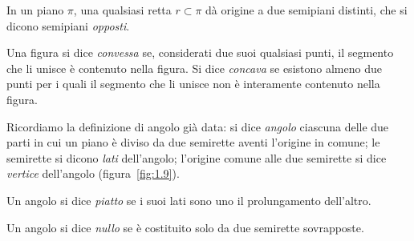 \begin{inaccessibleblock}
 \begin{center}\end{center}
\end{inaccessibleblock}
In un piano \({\pi}\), una qualsiasi retta \(r \subset \pi\) dà origine a 
due semipiani distinti, che si dicono semipiani \emph{opposti}.


\begin{definizione}
Una figura si dice \emph{convessa} se, considerati due suoi qualsiasi 
punti, il segmento che li unisce è contenuto nella figura. Si dice 
\emph{concava} se esistono almeno due punti per i quali il segmento 
che li unisce non è interamente contenuto nella figura. 
\end{definizione}

\begin{inaccessibleblock}
 \begin{center} \end{center}
\end{inaccessibleblock}

Ricordiamo la definizione di angolo già data: si dice \emph{angolo} 
ciascuna delle due parti in cui un piano è diviso da due semirette 
aventi l'origine in comune; le semirette si dicono \emph{lati} 
dell'angolo; l'origine comune alle due semirette si dice 
\emph{vertice} dell'angolo (figura~\ref{fig:1.9}).

\begin{definizione}
Un angolo si dice \emph{piatto} se i suoi lati sono uno il 
prolungamento dell'altro.
\end{definizione}

\begin{definizione}
Un angolo si dice \emph{nullo} se è costituito solo da due semirette 
sovrapposte.
\end{definizione}

